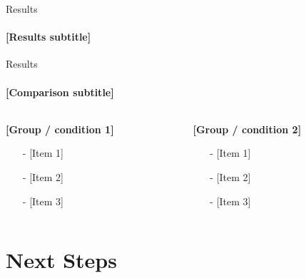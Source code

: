 \documentclass[t,pdf,aspectratio=169]{beamer}
\newcommand{\ph}[1]{[#1]}
\begin{document}
\begin{frame}
  \vfill
  \begin{center}
  \end{center}
  \vfill
\end{frame}

\begin{frame}{Results}
  \framesubtitle{\ph{Results subtitle}}
  \vfill
  \begin{figure}[h]
    \centering
  \end{figure}
  \vfill
\end{frame}

\begin{frame}{Results}
  \framesubtitle{\ph{Comparison subtitle}}
  \vfill
  \begin{columns}[t]
    \begin{column}{0.48\textwidth}
      \textbf{\ph{Group / condition 1}}
      \begin{itemize}
        \item[-] \ph{Item 1}
        \item[-] \ph{Item 2}
        \item[-] \ph{Item 3}
      \end{itemize}
    \end{column}
    \begin{column}{0.48\textwidth}
      \textbf{\ph{Group / condition 2}}
      \begin{itemize}
        \item[-] \ph{Item 1}
        \item[-] \ph{Item 2}
        \item[-] \ph{Item 3}
      \end{itemize}
    \end{column}
  \end{columns}
  \vfill
\end{frame}


\section{Next Steps}
\end{document}
